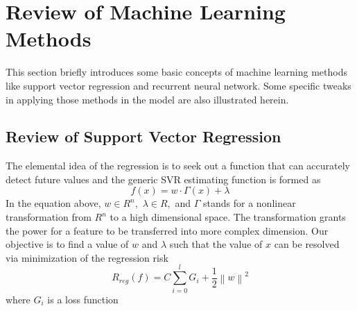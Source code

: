 \section{Review of Machine Learning Methods}
\label{sec:machine_learning_review}

This section briefly introduces some basic concepts of machine learning methods like support vector regression and recurrent neural network. Some specific tweaks in applying those methods in the model are also illustrated herein.
\subsection{Review of Support Vector Regression}

The elemental idea of the regression is to seek out a function that can accurately detect future values and the generic SVR estimating function is formed as
\[
f\left( x \right) =  {w \cdot \Gamma \left( x \right)}  + \lambda
\label{eq:1}
\]
In the equation above, $w \in {R^n},$ $\lambda \in {R},$ and $\Gamma$ stands for a nonlinear transformation from $R^n$ to a high dimensional space. The transformation grants the power for a feature to be transferred into more complex dimension. Our objective is to find a value of $w$ and $\lambda$ such that the value of $x$ can be resolved via minimization of the regression risk
\[
{R_{reg}}\left( f \right) = C\sum\limits_{i = 0}^l {{G _i} + \frac{1}{2}{{\left\| w \right\|}^2}}
\label{eq:2}
\]
where ${G _i}$ is a loss function
